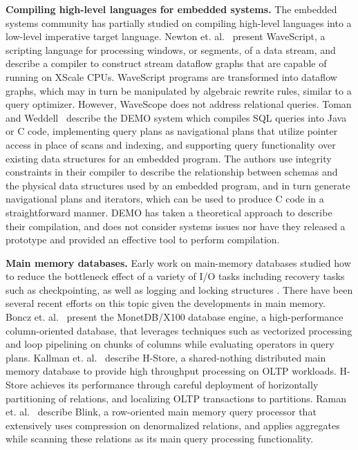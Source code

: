 \noindent \textbf{Compiling high-level languages for embedded systems.}
The embedded systems community has partially studied on compiling high-level
languages into a low-level imperative target language.
Newton et. al.~\cite{newton-lctes:08} present WaveScript, a scripting language
for processing windows, or segments, of a data stream, and describe a compiler to
construct stream dataflow graphs that are capable of running on XScale CPUs.
WaveScript programs are transformed into dataflow graphs, which may in turn be
manipulated by algebraic rewrite rules, similar to a query optimizer. However,
WaveScope does not address relational queries.
Toman and Weddell~\cite{toman-dbtel:01} describe the DEMO system which compiles
SQL queries into Java or C code, implementing query plans as navigational plans
that utilize pointer access in place of scans and indexing, and supporting query
functionality over existing data structures for an embedded program. The authors
use integrity constraints in their compiler to describe the relationship between
schemas and the physical data structures used by an embedded program, and in turn
generate navigational plans and iterators, which can be used to produce C code in
a straightforward manner. DEMO has taken a theoretical approach to describe
their compilation, and does not consider systems issues nor have they released
a prototype and provided an effective tool to perform compilation.


\noindent \textbf{Main memory databases.}
Early work on main-memory databases studied how to reduce the bottleneck effect
of a variety of I/O tasks including recovery tasks such as checkpointing, as well
as logging and locking structures \cite{bohannon-sigmod:99}. There have been
several recent efforts on this topic given the developments in main memory.
Boncz et. al.~\cite{boncz-cidr:05} present the MonetDB/X100 database engine, a
high-performance column-oriented database, that leverages techniques such as
vectorized processing and loop pipelining on chunks of columns while evaluating
operators in query plans. Kallman et. al.~\cite{kallman-pvldb:08} describe
H-Store, a shared-nothing distributed main memory database to provide high
throughput processing on OLTP workloads. H-Store achieves its performance through
careful deployment of horizontally partitioning of relations, and localizing OLTP
transactions to partitions. Raman et. al.~\cite{raman-icde:08} describe Blink, a
row-oriented main memory query processor that extensively uses compression on
denormalized relations, and applies aggregates while scanning these relations as
its main query processing functionality.

